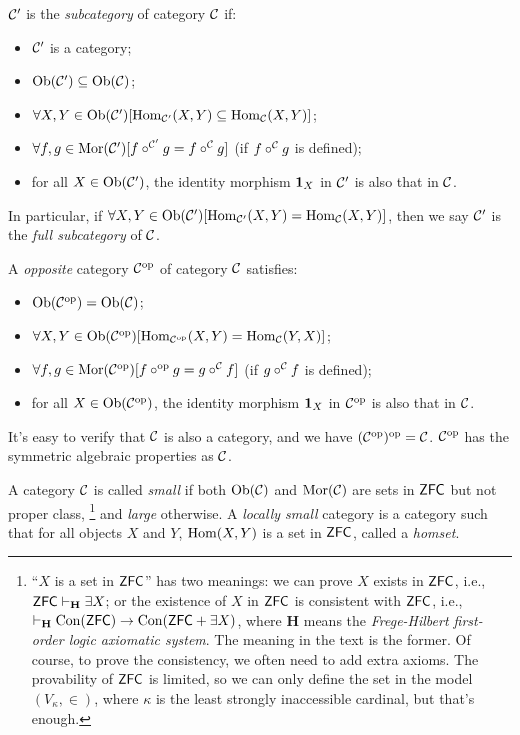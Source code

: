 \documentclass{article}
\begin{document}
\begin{defi}\label{subcategory, opposite category, small category}
	$\mathcal{C}'$ is the \emph{subcategory} of category $\mathcal{C}$ if:
	\begin{itemize}
		\item $\mathcal{C}'$ is a category;
		\item $\mathrm{Ob}(\mathcal{C}')\subseteq\mathrm{Ob}(\mathcal{C})$;
		\item $\forall X,Y\in\mathrm{Ob}(\mathcal{C}')[\mathrm{Hom}_{\mathcal{C}'}(X,Y)\subseteq\mathrm{Hom}_{\mathcal{C}}(X,Y)]$;
		\item $\forall f,g\in\mathrm{Mor}(\mathcal{C}')[f\circ^{\mathcal{C}'}g=f\circ^{\mathcal{C}}g]$ (if $f\circ^{\mathcal{C}}g$ is defined);
		\item for all $X\in\mathrm{Ob}(\mathcal{C}')$, the identity morphism $\mathbf{1}_X$ in $\mathcal{C}'$ is also that in $\mathcal{C}$.
	\end{itemize}
	In particular, if $\forall X,Y\in\mathrm{Ob}(\mathcal{C}')[\mathrm{Hom}_{\mathcal{C}'}(X,Y)=\mathrm{Hom}_{\mathcal{C}}(X,Y)]$, then we say 	$\mathcal{C}'$ is the \emph{full subcategory} of $\mathcal{C}$.
	
	A \emph{opposite} category $\mathcal{C}^\mathrm{op}$ of category $\mathcal{C}$ satisfies:
	\begin{itemize}
		\item $\mathrm{Ob}(\mathcal{C}^\mathrm{op})=\mathrm{Ob}(\mathcal{C})$;
		\item $\forall X,Y\in\mathrm{Ob}(\mathcal{C}^\mathrm{op})[\mathrm{Hom}_{\mathcal{C}^\mathrm{op}}(X,Y)=\mathrm{Hom}_{\mathcal{C}}(Y,X)]$;
		\item $\forall f,g\in\mathrm{Mor}(\mathcal{C}^\mathrm{op})[f\circ^\mathrm{op} g=g\circ^{\mathcal{C}} f]$ (if $g\circ^{\mathcal{C}} f$ is defined);
		\item for all $X\in\mathrm{Ob}(\mathcal{C}^\mathrm{op})$, the identity morphism $\mathbf{1}_X$ in $\mathcal{C}^\mathrm{op}$ is also that in $\mathcal{C}$.
	\end{itemize}
	It's easy to verify that $\mathcal{C}$ is also a category, and we have $(\mathcal{C}^\mathrm{op})^\mathrm{op}=\mathcal{C}$. $\mathcal{C}^\mathrm{op}$ has the symmetric algebraic properties as $\mathcal{C}$.
	
	A category $\mathcal{C}$ is called \emph{small} if both $\mathrm{Ob}(\mathcal{C})$ and $\mathrm{Mor}(\mathcal{C})$ are sets in $\mathsf{ZFC}$ but not proper class,
	 \footnote{``$X$ is a set in $\mathsf{ZFC}$'' has two meanings: we can prove $X$ exists in $\mathsf{ZFC}$, i.e., $\mathsf{ZFC}\vdash_\mathbf{H}\exists X$; or the existence of $X$ in $\mathsf{ZFC}$ is consistent with $\mathsf{ZFC}$, i.e., $\vdash_\mathbf{H}\mathrm{\mathrm{Con}}(\mathsf{ZFC})\to\mathrm{Con}(\mathsf{ZFC}+\exists X)$, where $\mathbf{H}$ means the \emph{Frege-Hilbert first-order logic axiomatic system}. The meaning in the text is the former. Of course, to prove the consistency, we often need to add extra axioms. The provability of $\mathsf{ZFC}$ is limited, so we can only define the set in the model $(V_\kappa,\in)$, where $\kappa$ is the least strongly inaccessible cardinal, but that's enough.}
	and \emph{large} otherwise. A \emph{locally small} category is a category such that for all objects $X$ and $Y$, $\mathrm{Hom}(X,Y)$ is a set in $\mathsf{ZFC}$, called a \emph{homset}.
\end{defi}
\end{document}
